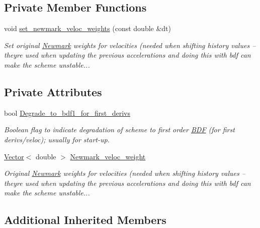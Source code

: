 \subsection*{Private Member Functions}
\begin{DoxyCompactItemize}
\item 
void \hyperlink{classoomph_1_1NewmarkBDF_adbe18fc7de8512a7d335832515ed34bb}{set\+\_\+newmark\+\_\+veloc\+\_\+weights} (const double \&dt)
\begin{DoxyCompactList}\small\item\em Set original \hyperlink{classoomph_1_1Newmark}{Newmark} weights for velocities (needed when shifting history values -- they\textquotesingle{}re used when updating the previous accelerations and doing this with bdf can make the scheme unstable... \end{DoxyCompactList}\end{DoxyCompactItemize}
\subsection*{Private Attributes}
\begin{DoxyCompactItemize}
\item 
bool \hyperlink{classoomph_1_1NewmarkBDF_a772c06965e20fdbe72520024c845131a}{Degrade\+\_\+to\+\_\+bdf1\+\_\+for\+\_\+first\+\_\+derivs}
\begin{DoxyCompactList}\small\item\em Boolean flag to indicate degradation of scheme to first order \hyperlink{classoomph_1_1BDF}{B\+DF} (for first derivs/veloc); usually for start-\/up. \end{DoxyCompactList}\item 
\hyperlink{classoomph_1_1Vector}{Vector}$<$ double $>$ \hyperlink{classoomph_1_1NewmarkBDF_ac6032c3a2bd0f7c64f51ad3c84c3ca16}{Newmark\+\_\+veloc\+\_\+weight}
\begin{DoxyCompactList}\small\item\em Original \hyperlink{classoomph_1_1Newmark}{Newmark} weights for velocities (needed when shifting history values -- they\textquotesingle{}re used when updating the previous accelerations and doing this with bdf can make the scheme unstable... \end{DoxyCompactList}\end{DoxyCompactItemize}
\subsection*{Additional Inherited Members}



